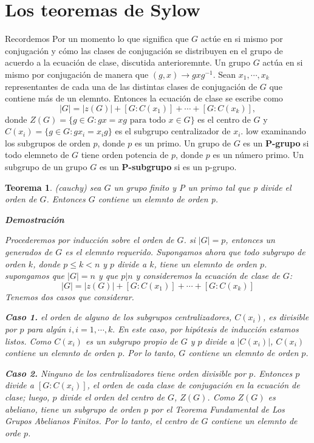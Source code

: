 \documentclass{article}
\newcounter{Teorema}
\numberwithin{equation}{section}
\theoremstyle{plain}  %
\newtheorem{thm}{Teorema}[section]
\providecommand{\abs}[1]{\lvert#1\rvert} %
\begin{document}
\section{Los teoremas de Sylow}
Recordemos Por un momento lo que significa que $G$ actúe en si mismo por conjugación y cómo las clases de conjugación se distribuyen en el grupo de acuerdo  a la ecuación de clase, discutida anterioremnte. 
Un grupo $G$ actúa en si mismo por conjugación de manera que $(g,x) \to gxg^{-1}$. 
Sean $x_{1}, \cdots , x_{k}$ representantes de cada una de las distintas clases de conjugación de $G$ que contiene más de un elemnto. Entonces la ecuación de clase se escribe como
\begin{equation*}
    \abs{G} = \abs{z(G)} + [G:C(x_{1})] + \cdots + [G: C(x_{k})], 
\end{equation*}
donde $Z(G) = \{g \in G : gx = xg \text{ para todo } x \in G\}$ es el centro de $G$ y $C(x_{i}) = \{ g \in G : gx_{i} = x_{i}g\}$ es el subgrupo centralizador de $x_{i}$. 
\vspace{5mm}low examinando los subgrupos de orden $p$, donde $p$ es un primo. Un grupo de $G$ es un \textbf{P-grupo} si todo elemneto de $G$ tiene orden potencia de $p$, donde $p$ es un  número primo. Un subgrupo de un grupo $G$ es un \textbf{P-subgrupo} si es un p-grupo. 
\begin{thm}
(cauchy) sea $G$ un grupo finito y P un primo tal que p divide el orden de $G$. Entonces $G$ contiene un elemnto de orden p.

\vspace{5mm}
\textbf{Demostración}
\vspace{5mm}

Procederemos por inducción sobre el orden de $G$. si $\abs{G}=p$, entonces un generados de $G$ es el elemnto requerido. Supongamos ahora que todo subgrupo de orden $k$, donde $p \leq k < n$ y $p$ divide a $k$, tiene un elemnto de orden $p$. supongamos que $\abs{G} = n$ y que $p | n$ y consideremos la ecuación de clase de $G$: 
\begin{equation*}
    \abs{G} = \abs{z(G)} + [G:C(x_{1})] + \cdots + [G: C(x_{k})]
\end{equation*}
Tenemos dos casos que considerar. 

\vspace{5mm}
\textbf{Caso 1.} el orden de alguno de los subgrupos centralizadores, $C(x_{i})$, es divisible por $p$ para algún $i, i = 1, \cdots, k.$ En este caso, por hipótesis de inducción estamos listos. Como $C(x_{i})$ es un subgrupo propio de $G$ y $p$ divide a $\abs{C(x_{i})}$, $C(x_{i})$ contiene un elemnto de orden $p$. Por lo tanto, $G$ contiene un elemnto de orden $p$. 

\vspace{5mm}
\textbf{Caso 2.} Ninguno de los centralizadores tiene orden divisible por $p$. Entonces $p$ divide a $[G:C(x_{i})]$, el orden de cada clase de conjugación en la ecuación de clase; luego, $p$ divide el orden del centro de $G$, $Z(G)$. Como $Z(G)$ es abeliano, tiene un subgrupo de orden $p$ por el Teorema Fundamental de Los Grupos Abelianos Finitos. Por lo tanto, el centro de $G$ contiene un elemnto de orde $p$.
\end{thm}
\end{document}
